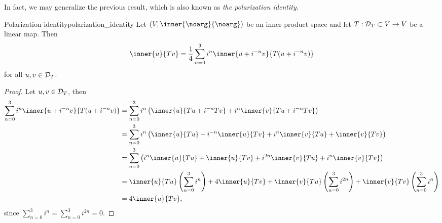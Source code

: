 In fact, we may generalize the previous result, which is also known as \emph{the polarization identity}.
\begin{proposition}{Polarization identity}{polarization_identity}
    Let \((V, \inner{\noarg}{\noarg})\) be an inner product space and let \(T : \mathcal{D}_{T}\subset V \to V\) be a linear map. Then
    \begin{equation*}
        \inner{u}{Tv} = \frac14\sum_{n=0}^3 i^{n}\inner{u + i^{-n}v}{T(u + i^{-n}v)}
    \end{equation*}
    for all \(u, v \in \mathcal{D}_{T}\).
\end{proposition}
\begin{proof}
    Let \(u, v \in \mathcal{D}_{T}\), then
    \begin{align*}
        \sum_{n=0}^3 i^{n} \inner{u+i^{-n}v}{T(u + i^{-n}v)} &= \sum_{n=0}^3 i^n \left(\inner{u}{Tu + i^{-n}Tv} + i^n \inner{v}{Tu+i^{-n}Tv}\right)\\
                                                             &= \sum_{n=0}^3 i^n \left(\inner{u}{Tu} + i^{-n}\inner{u}{Tv} + i^{n}\inner{v}{Tu} + \inner{v}{Tv}\right)\\
                                                            &= \sum_{n=0}^3 \left(i^n\inner{u}{Tu} + \inner{u}{Tv} + i^{2n}\inner{v}{Tu} + i^{n}\inner{v}{Tv}\right)\\
                                                            &= \inner{u}{Tu}\left(\sum_{n=0}^3 i^n\right) + 4\inner{u}{Tv}  + \inner{v}{Tu} \left(\sum_{n=0}^3 i^{2n}\right) + \inner{v}{Tv}\left(\sum_{n=0}^3 i^n\right)\\
                                                            &= 4\inner{u}{Tv},
    \end{align*}
    since \(\sum_{n=0}^3 i^n = \sum_{n=0}^3 i^{2n} = 0\).
\end{proof}

